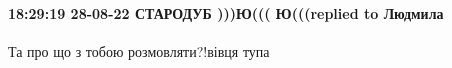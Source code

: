  
 
 
 
 

\paragraph{18:29:19 28-08-22 СТАРОДУБ )))Ю((( Ю(((replied to Людмила}
Та про що з тобою розмовляти?!вівця тупа🤣
